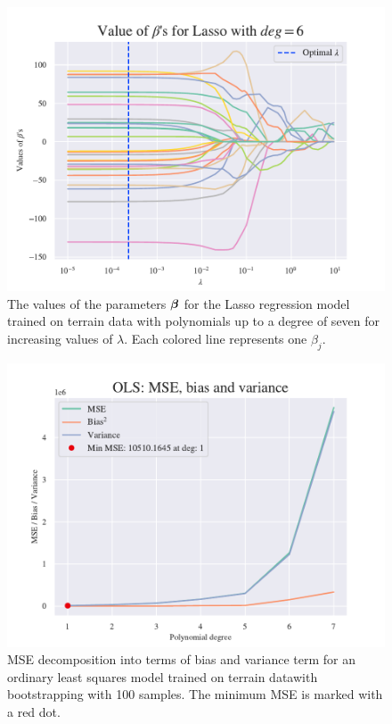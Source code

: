 \begin{figure}[H]
    \centering
    \includegraphics[width=1\linewidth]{project_1/figures/figures_in_appendix/Lasso_Betas_lambda_terrain_const_deg.pdf}
    \caption{The values of the parameters $\boldsymbol{\beta}$ for the Lasso regression model trained on terrain data with polynomials up to a degree of seven for increasing values of $\lambda$. Each colored line represents one $\beta_j$.}
    \label{fig:ref15}
\end{figure}

\begin{figure}[H]
    \centering
    \includegraphics[width=1\linewidth]{project_1/figures/figures_in_appendix/bias_var_terrain_bootstrap.pdf}
    \caption{MSE decomposition into terms of bias and variance term for an ordinary least squares model  trained on terrain datawith bootstrapping with 100 samples. The minimum MSE is marked with a red dot.}
    \label{fig:ref16}
\end{figure}
